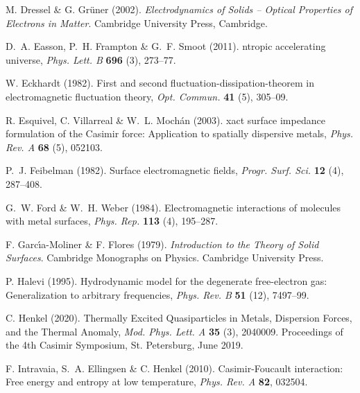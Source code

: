 \documentclass[11pt, oneside]{article}   	%
\begin{document}
\begin{thebibliography}{58}
M. Dressel \& G. Gr{\"u}ner (2002).
\newblock \emph{{E}lectrodynamics of {S}olids -- {O}ptical {P}roperties of
  {E}lectrons in {M}atter}.
\newblock Cambridge University Press, Cambridge.

D.~A. Easson, P.~H. Frampton \& G.~F. Smoot (2011).
ntropic accelerating universe, \emph{Phys. Lett. B} {\bf 696} (3),
  273--77.

W. Eckhardt (1982).
\newblock First and second fluctuation-dissipation-theorem in electromagnetic
  fluctuation theory, \emph{Opt. Commun.} {\bf 41} (5), 305--09.

R. Esquivel, C. Villarreal \& W.~L. Moch\'an (2003).
xact surface impedance formulation of the {C}asimir force:
  {A}pplication to spatially dispersive metals, \emph{Phys. Rev. A} {\bf 68}
  (5), 052103.

P.~J. Feibelman (1982).
\newblock Surface electromagnetic fields, \emph{Progr. Surf. Sci.} {\bf 12}
  (4), 287--408.

G.~W. Ford \& W.~H. Weber (1984).
\newblock Electromagnetic interactions of molecules with metal surfaces,
  \emph{Phys. Rep.} {\bf 113} (4), 195--287.

F. Garc{\'\i}a-Moliner \& F. Flores (1979).
\newblock \emph{Introduction to the Theory of Solid Surfaces}.
\newblock Cambridge Monographs on Physics. Cambridge University Press.

P. Halevi (1995).
\newblock Hydrodynamic model for the degenerate free-electron gas:
  Generalization to arbitrary frequencies, \emph{Phys. Rev. B} {\bf 51} (12),
  7497--99.

C. Henkel (2020).
\newblock Thermally Excited Quasiparticles in Metals, Dispersion Forces, and
  the Thermal Anomaly, \emph{Mod. Phys. Lett. A} {\bf 35} (3), 2040009.
\newblock Proceedings of the 4th Casimir Symposium, St. Petersburg, June 2019.

F. Intravaia, S.~A. Ellingsen \& C. Henkel (2010).
\newblock Casimir-Foucault interaction: Free energy and entropy at low
  temperature, \emph{Phys. Rev. A} {\bf 82}, 032504.


\end{thebibliography}
\end{document}
